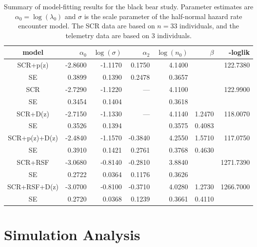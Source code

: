 \documentclass[12pt]{article}
\begin{document}
\begin{table}
\centering
\caption{
Summary of model-fitting results for the black bear study. Parameter
estimates are $\alpha_{0} = \log(\lambda_{0})$ and $\sigma$ is the
scale parameter of the half-normal hazard rate encounter model.
The SCR data are based on $n=33$ individuals, and the telemetry data
are based on 3 individuals.
}
\begin{tabular}{c|rrrrrr}
\hline \hline
model & $\alpha_0$ & $\log(\sigma)$ & $\alpha_{2}$ & $\log(n_{0})$ &
$\beta$ & -loglik \\ \hline
SCR+p(z)     & -2.8600  & -1.1170  &  0.1750 &  4.1400   &        &122.7380  \\
   SE        &  0.3899 &  0.1390 &  0.2478&  0.3657  &        & \\
 SCR         & -2.7290  &  -1.1220 &  ---&  4.1100   &        &              122.9900   \\
   SE        &  0.3454 &   0.1404&        &  0.3618  &        &       \\
SCR+D(z)     & -2.7150  & -1.1330  &  ---  &  4.1140   & 1.2470  &   118.0070  \\
   SE        &  0.3526 & 0.1394  &        &  0.3575  & 0.4083 &       \\
SCR+p(z)+D(z)& -2.4840  & -1.1570  &-0.3840  &  4.2550   & 1.5710  &      117.0750 \\
   SE        &  0.3910 &  0.1421 & 0.2761 &  0.3768  & 0.4630 & \\
SCR+RSF     &   -3.0680  & -0.8140  &-0.2810  &  3.8840   &        &   1271.7390 \\
   SE       &    0.2722 &  0.0364 & 0.1176 &  0.3626  &        & \\
SCR+RSF+D(z)&  -3.0700  &-0.8100   &-0.3710  &  4.0280   & 1.2730  &   1266.7000 \\
   SE       &   0.2720 &  0.0368  & 0.1239 &  0.3661  & 0.4110 &    \\
\hline
\end{tabular}
\label{tab.nyresults}
\end{table}





\section{Simulation Analysis}
\end{document}
